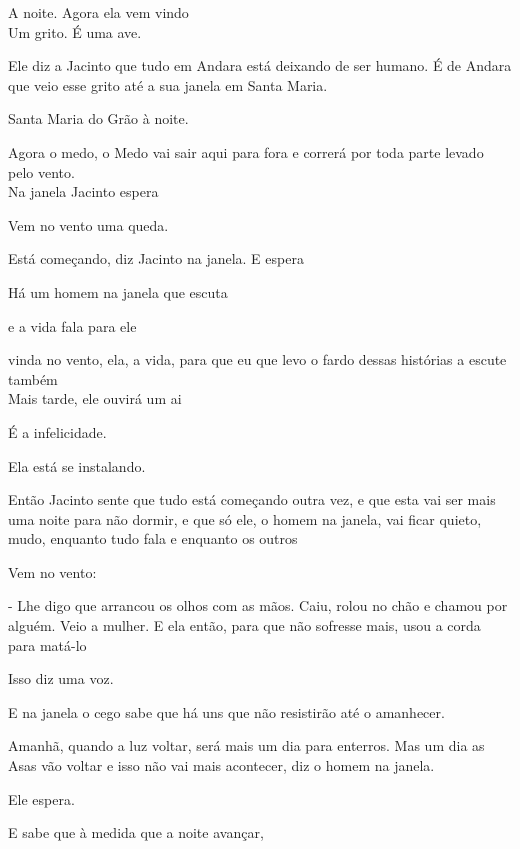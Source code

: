 A noite. Agora ela vem vindo\\

Um grito. É uma ave.

Ele diz a Jacinto que tudo em Andara está deixando de ser humano. É de
Andara que veio esse grito até a sua janela em Santa Maria.

Santa Maria do Grão à noite.

Agora o medo, o Medo vai sair aqui para fora e correrá por toda parte
levado pelo vento.\\

Na janela Jacinto espera

Vem no vento uma queda.

Está começando, diz Jacinto na janela. E espera

Há um homem na janela que escuta

e a vida fala para ele

vinda no vento, ela, a vida, para que eu que levo o fardo dessas
histórias a escute também\\

Mais tarde, ele ouvirá um ai

É a infelicidade.

Ela está se instalando.

Então Jacinto sente que tudo está começando outra vez, e que esta vai
ser mais uma noite para não dormir, e que só ele, o homem na janela, vai
ficar quieto, mudo, enquanto tudo fala e enquanto os outros

Vem no vento:

- Lhe digo que arrancou os olhos com as mãos. Caiu, rolou no chão e
chamou por alguém. Veio a mulher. E ela então, para que não sofresse
mais, usou a corda para matá-lo

Isso diz uma voz.

E na janela o cego sabe que há uns que não resistirão até o amanhecer.

Amanhã, quando a luz voltar, será mais um dia para enterros. Mas um dia
as Asas vão voltar e isso não vai mais acontecer, diz o homem na janela.

Ele espera.

E sabe que à medida que a noite avançar,

